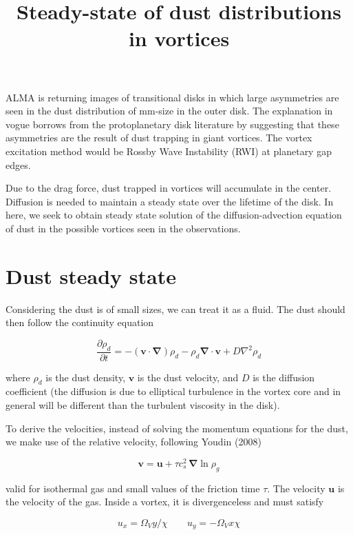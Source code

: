 \documentclass[useAMS,8pt,twocolumn]{article}
\newcommand{\pderiv}[2]{\frac{\partial #1}{\partial #2}}
\renewcommand{\v}[1]{{\boldsymbol{#1}}} %
\newcommand{\del}{\v{\nabla}}
\newcommand{\grad}{\del}
\newcommand{\Div}{\del\cdot}
\newcommand{\Laplace}{\nabla^2}
\newcommand{\beq}{\begin{equation}}
\newcommand{\eeq}{\end{equation}}
\begin{document}
\date{}

\title{Steady-state of dust distributions in vortices}
\author{}

\maketitle

ALMA is returning images of transitional disks in which large
asymmetries are seen in the dust distribution of mm-size in the outer
disk. The explanation in vogue borrows from the protoplanetary disk 
literature by suggesting that these asymmetries are the
result of dust trapping in giant vortices. The vortex excitation method would
be Rossby Wave Instability (RWI) at planetary gap edges. 

Due to the drag force, dust trapped in vortices will accumulate in the
center. Diffusion is needed to maintain a steady state over the
lifetime of the disk. In here, we seek to obtain steady state solution
of the diffusion-advection equation of dust in the possible vortices 
seen in the observations. 

\section{Dust steady state} 

Considering the dust is of small sizes, we can treat it as a
fluid. The dust should then follow the continuity equation 

\beq
  \pderiv{\rho_d}{t} = -(\v{v}\cdot\del)\rho_d - \rho_d \Div{\v{v}} + D\Laplace{\rho_d}
\eeq

\noindent where $\rho_d$ is the dust density, $\v{v}$ is the dust
velocity, and $D$ is the diffusion coefficient (the diffusion is due
to elliptical turbulence in the vortex core and in general will be
different than the turbulent viscosity in the disk). 

To derive the velocities, instead of solving the momentum equations
for the dust, we make use of the relative velocity, following Youdin
(2008)  

\beq
\v{v} = \v{u} + \tau  c_s^2 \,  \grad{\ln \rho_g} 
\label{eq:v}
\eeq

\noindent valid for isothermal gas and small values of the friction time $\tau$. The
velocity $\v{u}$ is the velocity of the gas. Inside a vortex, it is
divergenceless and must satisfy 

\beq
  u_x = \varOmega_V y / \chi \qquad  u_y= -\varOmega_V x \chi
\eeq
\end{document}
